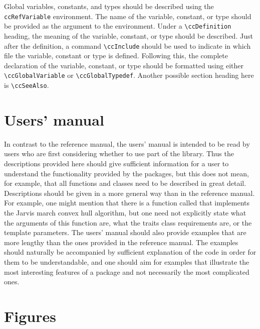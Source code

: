 Global variables, constants, and types should be described using the 
{\tt ccRefVariable} environment.%
The name of the variable, constant, or
type should be provided as the argument to the environment.  Under a
\verb|\ccDefinition| heading, the meaning of the variable, constant,
or type should be described.  Just after the definition, a command 
\verb|\ccInclude| should be used to indicate in which file the variable,
constant or type
is defined.  Following this, the complete declaration of the variable,
constant, or type should be formatted using either \verb|\ccGlobalVariable|
or \verb|\ccGlobalTypedef|.  Another possible section heading here is
\verb|\ccSeeAlso|.

\section{Users' manual}
\label{sec:users_manual}

In contrast to the reference manual, the users' manual is intended to be
read by users who are first considering whether to use part of the library.
Thus the descriptions provided here should give sufficient information
for a user to understand the functionality provided by the packages, but
this does not mean, for example, that all functions and classes need to
be described in great detail.  Descriptions should be given in a more 
general way than in the reference manual.  For example, one might mention 
that there is a function called  that implements the Jarvis 
march convex hull algorithm, but one need not explicitly state what the 
arguments of this function are, what the traits class requirements are,
or the template parameters. The users' manual should also provide examples%
that are more lengthy than the ones provided in
the reference manual.  The examples should naturally be accompanied by
sufficient explanation of the code in order for them to be understandable,
and one should aim for examples that illustrate the most interesting 
features of a package and not necessarily the most complicated ones.

\section{Figures}
\label{sec:doc_figures}

